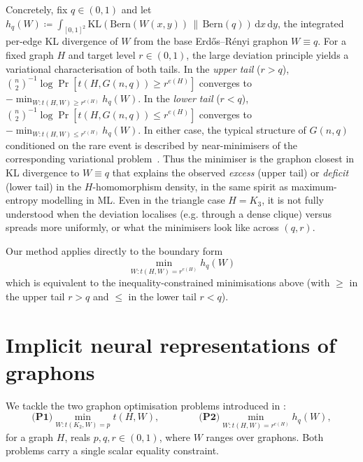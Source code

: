 \documentclass[11pt]{article}
\theoremstyle{plain}
\theoremstyle{definition}
\theoremstyle{remark}
\begin{document}
Concretely, fix $q \in (0,1)$ and let $h_q(W) \coloneqq \int_{[0,1]^2} \mathrm{KL}(\mathrm{Bern}(W(x,y))\,\|\,\mathrm{Bern}(q))\,\mathrm{d}x\,\mathrm{d}y$, the integrated per-edge KL divergence of $W$ from the base Erd\H{o}s--R\'enyi graphon $W \equiv q$.
For a fixed graph $H$ and target level $r \in (0,1)$, the large deviation principle yields a variational characterisation of both tails.
In the \emph{upper tail} ($r > q$), $\binom{n}{2}^{-1}\log\Pr[t(H, G(n,q)) \ge r^{e(H)}]$ converges to $-\min_{W: t(H,W) \ge r^{e(H)}} h_q(W)$.
In the \emph{lower tail} ($r < q$), $\binom{n}{2}^{-1}\log\Pr[t(H, G(n,q)) \le r^{e(H)}]$ converges to $-\min_{W: t(H,W) \le r^{e(H)}} h_q(W)$.
In either case, the typical structure of $G(n,q)$ conditioned on the rare event is described by near-minimisers of the corresponding variational problem~\citep{lubetzky2015replica}.
Thus the minimiser is the graphon closest in KL divergence to $W \equiv q$ that explains the observed \emph{excess} (upper tail) or \emph{deficit} (lower tail) in the $H$-homomorphism density, in the same spirit as maximum-entropy modelling in ML\@.
Even in the triangle case $H = K_3$, it is not fully understood when the deviation localises (e.g. through a dense clique) versus spreads more uniformly, or what the minimisers look like across $(q,r)$.

Our method applies directly to the boundary form
\begin{equation}
\label{eqn:large-deviation-problem}
  \min_{W : t(H,W) = r^{e(H)}} h_q(W)
\end{equation}
which is equivalent to the inequality-constrained minimisations above (with $\ge$ in the upper tail $r>q$ and $\le$ in the lower tail $r<q$).

\section{Implicit neural representations of graphons} \label{sec:method}

We tackle the two graphon optimisation problems introduced in :
\begin{equation}
\textbf{(P1)} \min_{W : t(K_2, W) = p}  t(H, W),
\qquad\qquad
\textbf{(P2)} \min_{W : t(H, W) = r^{e(H)}} h_q(W),
\label{eqn:targetproblems}
\end{equation}
for a graph $H$, reals $p,q,r \in (0,1)$, where $W$ ranges over graphons. Both problems carry a single scalar equality constraint.
\end{document}
